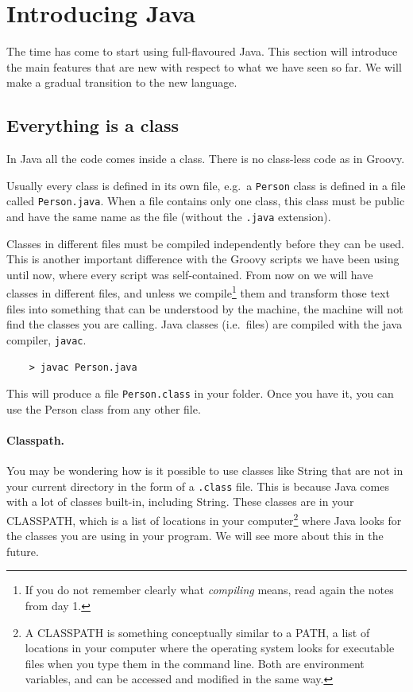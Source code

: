
\section{Introducing Java}
\label{sec:introducing-java}

The time has come to start using full-flavoured Java. This section
will introduce the main features that are new with respect to what we
have seen so far. We will make a gradual transition to the new
language. 

\subsection{Everything is a class}
\label{sec:everything-class}

In Java all the code comes inside a class. There is no class-less
code as in Groovy. 

Usually every class is defined in its own file, e.g.~a \verb+Person+
class is defined in a file called \verb+Person.java+. When a file
contains only one class, this class must be public and have the same
name as the file (without the \verb+.java+ extension). 

Classes in different files must be compiled independently before they
can be used. This is another important difference with the Groovy
scripts we have been using until now, where every script was
self-contained. From now on we will have classes in different files,
and unless we compile\footnote{If you do not remember clearly what
  \emph{compiling} means, read again the notes from day 1. } them and
transform those text files into something that can be understood by
the machine, the machine will not find the classes you are
calling. Java classes (i.e.~files) are compiled with the java
compiler, \verb+javac+. 

\begin{verbatim}
    > javac Person.java
\end{verbatim}

This will produce a file \verb+Person.class+ in your folder. Once you
have it, you can use the Person class from any other file. 

\paragraph{Classpath. }
\label{sec:classpath.-}

You may be wondering how is it possible to use classes like String
that are not in your current directory in the form of a \verb+.class+
file. This is because Java comes with a lot of classes built-in,
including String. These classes are in your CLASSPATH, which is a list
of locations in your computer\footnote{A CLASSPATH is something
  conceptually similar to a PATH, a list of locations in your computer
  where the operating system looks for executable files when you type
  them in the command line. Both are environment variables, and can be
  accessed and modified in the same way.} where Java looks for the
classes you are using in your program. We will see more about this in
the future.


